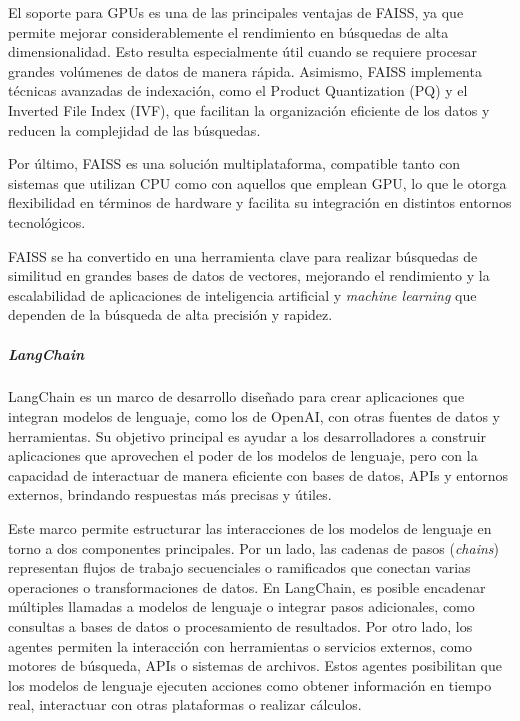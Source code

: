 El soporte para GPUs es una de las principales ventajas de FAISS, ya que permite mejorar considerablemente el rendimiento en búsquedas de alta dimensionalidad. Esto resulta especialmente útil cuando se requiere procesar grandes volúmenes de datos de manera rápida. Asimismo, FAISS implementa técnicas avanzadas de indexación, como el Product Quantization (PQ) y el Inverted File Index (IVF), que facilitan la organización eficiente de los datos y reducen la complejidad de las búsquedas.

Por último, FAISS es una solución multiplataforma, compatible tanto con sistemas que utilizan CPU como con aquellos que emplean GPU, lo que le otorga flexibilidad en términos de hardware y facilita su integración en distintos entornos tecnológicos.

FAISS se ha convertido en una herramienta clave para realizar búsquedas de similitud en grandes bases de datos de vectores, mejorando el rendimiento y la escalabilidad de aplicaciones de inteligencia artificial y \textit{machine learning} que dependen de la búsqueda de alta precisión y rapidez.

\subparagraph{LangChain}

LangChain es un marco de desarrollo diseñado para crear aplicaciones que integran modelos de lenguaje, como los de OpenAI, con otras fuentes de datos y herramientas. Su objetivo principal es ayudar a los desarrolladores a construir aplicaciones que aprovechen el poder de los modelos de lenguaje, pero con la capacidad de interactuar de manera eficiente con bases de datos, APIs y entornos externos, brindando respuestas más precisas y útiles.

Este marco permite estructurar las interacciones de los modelos de lenguaje en torno a dos componentes principales. Por un lado, las cadenas de pasos (\textit{chains}) representan flujos de trabajo secuenciales o ramificados que conectan varias operaciones o transformaciones de datos. En LangChain, es posible encadenar múltiples llamadas a modelos de lenguaje o integrar pasos adicionales, como consultas a bases de datos o procesamiento de resultados. Por otro lado, los agentes permiten la interacción con herramientas o servicios externos, como motores de búsqueda, APIs o sistemas de archivos. Estos agentes posibilitan que los modelos de lenguaje ejecuten acciones como obtener información en tiempo real, interactuar con otras plataformas o realizar cálculos.

